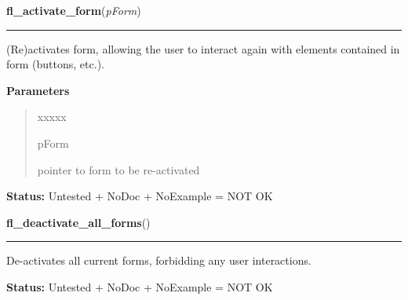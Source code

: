 \hspace{.8\funcindent}\begin{boxedminipage}{\funcwidth}

    \raggedright \textbf{fl\_activate\_form}(\textit{pForm})

    \vspace{-1.5ex}

    \rule{\textwidth}{0.5\fboxrule}
\setlength{\parskip}{2ex}
    (Re)activates form, allowing the user to interact again with elements 
    contained in form (buttons, etc.).

\setlength{\parskip}{1ex}
      \textbf{Parameters}
      \vspace{-1ex}

      \begin{quote}
        \begin{Ventry}{xxxxx}

          \item[pForm]

          pointer to form to be re-activated

        \end{Ventry}

      \end{quote}

\textbf{Status:} Untested + NoDoc + NoExample = NOT OK



    \end{boxedminipage}

    \label{xformslib:library:fl_deactivate_all_forms}

    \vspace{0.5ex}

\hspace{.8\funcindent}\begin{boxedminipage}{\funcwidth}

    \raggedright \textbf{fl\_deactivate\_all\_forms}()

    \vspace{-1.5ex}

    \rule{\textwidth}{0.5\fboxrule}
\setlength{\parskip}{2ex}
    De-activates all current forms, forbidding any user interactions.

\setlength{\parskip}{1ex}
\textbf{Status:} Untested + NoDoc + NoExample = NOT OK



    \end{boxedminipage}

